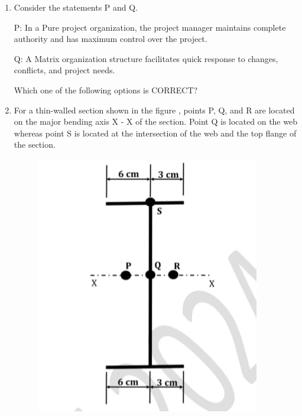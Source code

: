 \documentclass[journal,12pt,onecolumn]{article}
\theoremstyle{remark}
\begin{document}
\begin{enumerate}
    \item Consider the statements P and Q.
    
    P: In a Pure project organization, the project manager maintains complete authority
    and has maximum control over the project.
    
    Q: A Matrix organization structure facilitates quick response to changes, conflicts,
    and project needs.
    
    Which one of the following options is CORRECT?
    
    \hfill{}
    \begin{enumerate}
    \end{enumerate}

    \item For a thin-walled section shown in the figure , points P, Q, and R are located on the
    major bending axis X - X of the section. Point Q is located on the web whereas point
    S is located at the intersection of the web and the top flange of the section.
    \begin{figure}[H]
        \centering
        \includegraphics[width=0.7\columnwidth]{figs/2Q18.jpg}
        \caption{}
        \label{fig:q18}
    \end{figure}
    

\end{enumerate}
\end{document}
